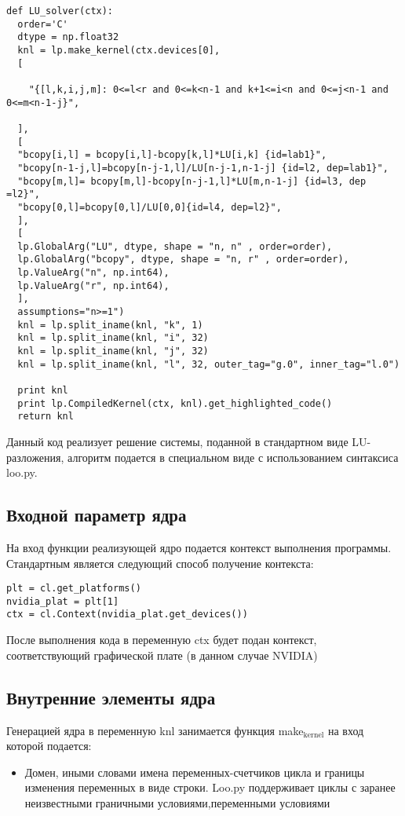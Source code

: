 \documentclass{scrartcl}
\begin{document}
\begin{verbatim}
def LU_solver(ctx):
  order='C'
  dtype = np.float32
  knl = lp.make_kernel(ctx.devices[0], 
  [

    "{[l,k,i,j,m]: 0<=l<r and 0<=k<n-1 and k+1<=i<n and 0<=j<n-1 and 0<=m<n-1-j}",

  ],
  [
  "bcopy[i,l] = bcopy[i,l]-bcopy[k,l]*LU[i,k] {id=lab1}",
  "bcopy[n-1-j,l]=bcopy[n-j-1,l]/LU[n-j-1,n-1-j] {id=l2, dep=lab1}",
  "bcopy[m,l]= bcopy[m,l]-bcopy[n-j-1,l]*LU[m,n-1-j] {id=l3, dep =l2}",
  "bcopy[0,l]=bcopy[0,l]/LU[0,0]{id=l4, dep=l2}",
  ],
  [
  lp.GlobalArg("LU", dtype, shape = "n, n" , order=order),
  lp.GlobalArg("bcopy", dtype, shape = "n, r" , order=order),
  lp.ValueArg("n", np.int64),
  lp.ValueArg("r", np.int64),
  ],
  assumptions="n>=1")
  knl = lp.split_iname(knl, "k", 1)
  knl = lp.split_iname(knl, "i", 32)
  knl = lp.split_iname(knl, "j", 32)
  knl = lp.split_iname(knl, "l", 32, outer_tag="g.0", inner_tag="l.0")

  print knl
  print lp.CompiledKernel(ctx, knl).get_highlighted_code()   
  return knl
\end{verbatim}
Данный код реализует решение системы, поданной в стандартном виде LU-разложения,
алгоритм подается в специальном виде с использованием синтаксиса loo.py.
\subsection{Входной параметр ядра}
\label{sec-7-3}

На вход функции реализующей ядро подается контекст выполнения программы. Стандартным
является следующий способ получение контекста:

\begin{verbatim}
plt = cl.get_platforms()
nvidia_plat = plt[1]
ctx = cl.Context(nvidia_plat.get_devices())
\end{verbatim}
После выполнения кода в переменную ctx будет подан контекст, соответствующий 
графической плате (в данном случае NVIDIA)
\subsection{Внутренние элементы ядра}
\label{sec-7-4}

Генерацией ядра в переменную knl занимается функция make$_{\mathrm{kernel}}$ на вход которой подается:
\begin{itemize}
\item Домен, иными словами имена переменных-счетчиков цикла и границы изменения переменных в виде строки.
 Loo.py поддерживает циклы с заранее неизвестными граничными условиями,переменными условиями
\end{itemize}
\end{document}
